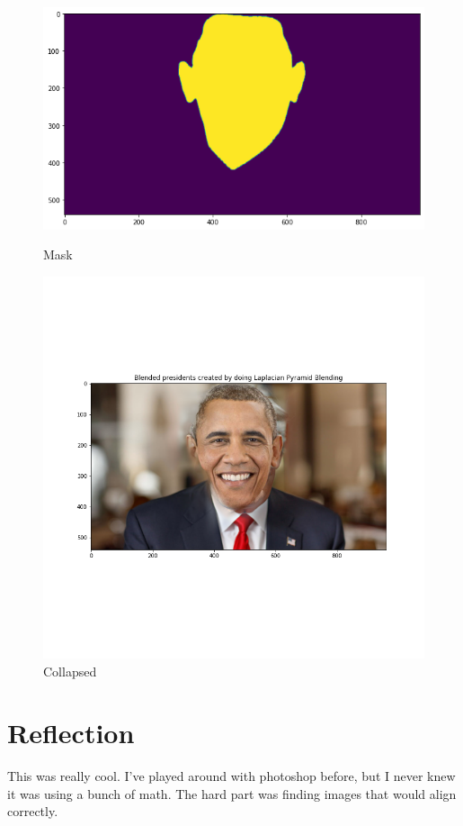 \documentclass{article}
\begin{document}
\begin{figure}[!htb]
    \includegraphics[width=\linewidth]{president_mask.png}
    \caption{Mask}
\endminipage
{}
    \includegraphics[width=\linewidth]{mypresident.png}
    \caption{Collapsed}
\endminipage
\end{figure}
\FloatBarrier

\section{Reflection}
This was really cool. I've played around with photoshop before, but I never knew it was using a bunch of math. The hard part was finding images that would align correctly.
\end{document}
